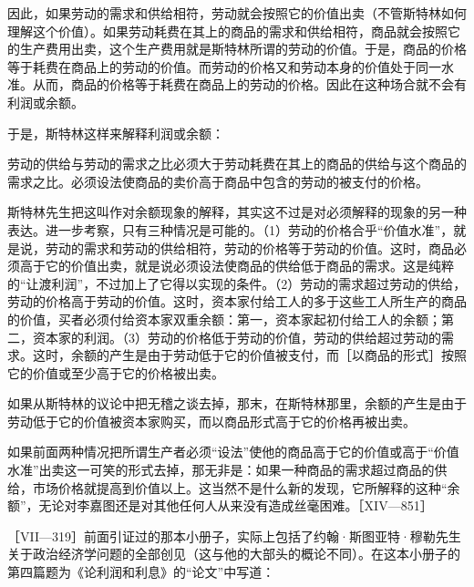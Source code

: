 因此，如果劳动的需求和供给相符，劳动就会按照它的价值出卖（不管斯特林如何理解这个价值）。如果劳动耗费在其上的商品的需求和供给相符，商品就会按照它的生产费用出卖，这个生产费用就是斯特林所谓的劳动的价值。于是，商品的价格等于耗费在商品上的劳动的价值。而劳动的价格又和劳动本身的价值处于同一水准。从而，商品的价格等于耗费在商品上的劳动的价格。因此在这种场合就不会有利润或余额。

于是，斯特林这样来解释利润或余额：

劳动的供给与劳动的需求之比必须大于劳动耗费在其上的商品的供给与这个商品的需求之比。必须设法使商品的卖价高于商品中包含的劳动的被支付的价格。

斯特林先生把这叫作对余额现象的解释，其实这不过是对必须解释的现象的另一种表达。进一步考察，只有三种情况是可能的。（1）劳动的价格合乎“价值水准”，就是说，劳动的需求和劳动的供给相符，劳动的价格等于劳动的价值。这时，商品必须高于它的价值出卖，就是说必须设法使商品的供给低于商品的需求。这是纯粹的“让渡利润”，不过加上了它得以实现的条件。（2）劳动的需求超过劳动的供给，劳动的价格高于劳动的价值。这时，资本家付给工人的多于这些工人所生产的商品的价值，买者必须付给资本家双重余额：第一，资本家起初付给工人的余额；第二，资本家的利润。（3）劳动的价格低于劳动的价值，劳动的供给超过劳动的需求。这时，余额的产生是由于劳动低于它的价值被支付，而［以商品的形式］按照它的价值或至少高于它的价格被出卖。

如果从斯特林的议论中把无稽之谈去掉，那末，在斯特林那里，余额的产生是由于劳动低于它的价值被资本家购买，而以商品形式高于它的价格再被出卖。

如果前面两种情况把所谓生产者必须“设法”使他的商品高于它的价值或高于“价值水准”出卖这一可笑的形式去掉，那无非是：如果一种商品的需求超过商品的供给，市场价格就提高到价值以上。这当然不是什么新的发现，它所解释的这种“余额”，无论对李嘉图还是对其他任何人从来没有造成丝毫困难。［XIV—851］



［VII—319］前面引证过的那本小册子，实际上包括了约翰·斯图亚特·穆勒先生关于政治经济学问题的全部创见（这与他的大部头的概论不同）。在这本小册子的第四篇题为《论利润和利息》的“论文”中写道：

